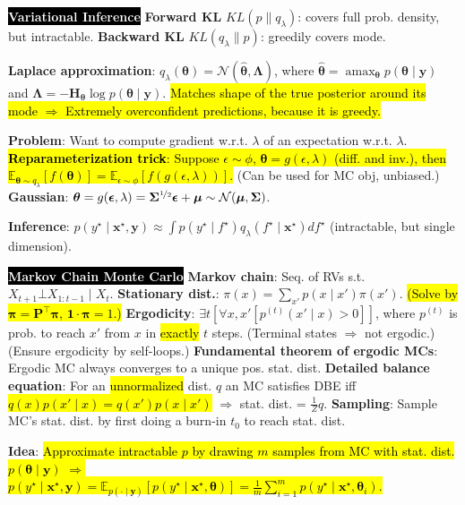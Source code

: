\documentclass{article}
\DeclareMathOperator*{\argmax}{amax}
\newcommand{\E}{\mathbb{E}}
\newenvironment{topic}[1]
{\textbf{\sffamily  \colorbox{black}{\textcolor{white}{#1}}}}
{}
\begin{document}
\begin{multicols*}{3}
\begin{topic}{Variational Inference}
    \textbf{Forward KL} $KL(p \mathrel{\lVert} q_\lambda)$: covers full prob.
    density, but intractable. \textbf{Backward KL} $KL(q_\lambda
    \mathrel{\lVert} p)$: greedily covers mode.

    \textbf{Laplace approximation}: $q_{\lambda}(\bm{\theta}) =
    \mathcal{N}(\hat{\bm{\theta}}, \bm{\Lambda})$, where $\hat{\bm{\theta}} =
    \argmax_{\bm{\theta}} p(\bm{\theta} \mid \bm{y})$ and
    $\bm{\Lambda}=-\bm{H}_{\bm{\theta}} \log p(\bm{\theta}\mid\bm{y})$.
    \hl{Matches shape of the true posterior around its mode $\Rightarrow$
    Extremely overconfident predictions, because it is greedy.}

    \textbf{Problem}: Want to compute gradient w.r.t. $\lambda$ of an
    expectation w.r.t. $\lambda$. \hl{\textbf{Reparameterization trick}:
    Suppose $\epsilon \sim \phi$, $\bm{\theta} = g(\epsilon,\lambda)$ (diff.
    and inv.), then $\E_{\bm{\theta} \sim q_\lambda}[f(\bm{\theta})] =
    \E_{\epsilon\sim\phi}[f(g(\epsilon,\lambda))]$.} (Can be used for MC obj,
    unbiased.) \textbf{Gaussian}: $\bm{\theta} = g(\bm{\epsilon},\lambda) =
    \bm{\Sigma}^{\nicefrac{1}{2}} \bm{\epsilon} + \bm{\mu} \sim
    \mathcal{N}(\bm{\mu},\bm{\Sigma})$.

    \textbf{Inference}: $p(y^\star\mid\bm{x}^\star,\bm{y}) \approx \int
    p(y^\star\mid f^\star) q_{\lambda}(f^\star\mid\bm{x}^\star) df^\star$
    (intractable, but single dimension).
  \end{topic}

  \begin{topic}{Markov Chain Monte Carlo}
    \textbf{Markov chain}: Seq. of RVs s.t. $X_{t+1} \bot X_{1:t-1} \mid X_t$.
    \textbf{Stationary dist.}: $\pi(x) = \sum_{x'}p(x\mid x')\pi(x')$.
    \hl{(Solve by $\bm{\pi} = \bm{P}^\top\bm{\pi}$, $\bm{1}\cdot \bm{\pi}=1$.)}
    \textbf{Ergodicity}: $\exists t [ \forall x,x' [ p^{(t)}(x'\mid x) > 0 ]]$,
    where $p^{(t)}$ is prob. to reach $x'$ from $x$ in \hl{exactly} $t$ steps.
    (Terminal states $\Rightarrow$ not ergodic.) (Ensure ergodicity by
    self-loops.) \textbf{Fundamental theorem of ergodic MCs}: Ergodic MC always
    converges to a unique pos. stat. dist. \textbf{Detailed balance equation}:
    For an \hl{unnormalized} dist. $q$ an MC satisfies DBE iff
    \hl{$q(x)p(x'\mid x) = q(x')p(x\mid x')$} $\Rightarrow$ stat. dist. =
    $\frac{1}{Z} q$. \textbf{Sampling}: Sample MC's stat. dist. by first doing
    a burn-in $t_0$ to reach stat. dist.

    \textbf{Idea}: \hl{Approximate intractable $p$ by drawing $m$ samples from
    MC with stat. dist. $p(\bm{\theta}\mid\bm{y})$ $\Rightarrow$
    $p(y^\star\mid\bm{x}^\star,\bm{y}) =
    \E_{p(\cdot\mid\bm{y})}[p(y^\star\mid\bm{x}^\star,\bm{\theta})] =
    \frac{1}{m}\sum_{i=1}^m p(y^\star\mid\bm{x}^\star,\bm{\theta}_i)$.}


\end{topic}
\end{multicols*}
\end{document}
